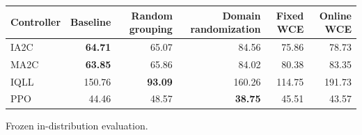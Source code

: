 \begin{tabular}{lrrrrr}
\hline
Controller & Baseline & Random grouping & Domain randomization & Fixed WCE & Online WCE \\
\hline
IA2C & \textbf{64.71} & 65.07 & 84.56 & 75.86 & 78.73 \\
MA2C & \textbf{63.85} & 65.86 & 84.02 & 80.38 & 83.35 \\
IQLL & 150.76 & \textbf{93.09} & 160.26 & 114.75 & 191.73 \\
PPO & 44.46 & 48.57 & \textbf{38.75} & 45.51 & 43.57 \\
\hline
\end{tabular}
Frozen in-distribution evaluation.
